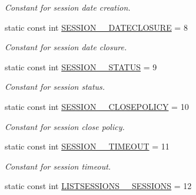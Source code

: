 \begin{DoxyCompactItemize}
\begin{DoxyCompactList}\small\item\em Constant for session date creation. \item\end{DoxyCompactList}\item 
\hypertarget{classUMS__Data_1_1UMS__DataPackage_a870200153f23867dd869f3ebe251b6c2}{
static const int \hyperlink{classUMS__Data_1_1UMS__DataPackage_a870200153f23867dd869f3ebe251b6c2}{SESSION\_\-\_\-DATECLOSURE} = 8}
\label{classUMS__Data_1_1UMS__DataPackage_a870200153f23867dd869f3ebe251b6c2}

\begin{DoxyCompactList}\small\item\em Constant for session date closure. \item\end{DoxyCompactList}\item 
\hypertarget{classUMS__Data_1_1UMS__DataPackage_a7ff54094507a9ae61efb3e4b3c8d2afa}{
static const int \hyperlink{classUMS__Data_1_1UMS__DataPackage_a7ff54094507a9ae61efb3e4b3c8d2afa}{SESSION\_\-\_\-STATUS} = 9}
\label{classUMS__Data_1_1UMS__DataPackage_a7ff54094507a9ae61efb3e4b3c8d2afa}

\begin{DoxyCompactList}\small\item\em Constant for session status. \item\end{DoxyCompactList}\item 
\hypertarget{classUMS__Data_1_1UMS__DataPackage_a32718def2b47a98f55bb93a8b316d7d5}{
static const int \hyperlink{classUMS__Data_1_1UMS__DataPackage_a32718def2b47a98f55bb93a8b316d7d5}{SESSION\_\-\_\-CLOSEPOLICY} = 10}
\label{classUMS__Data_1_1UMS__DataPackage_a32718def2b47a98f55bb93a8b316d7d5}

\begin{DoxyCompactList}\small\item\em Constant for session close policy. \item\end{DoxyCompactList}\item 
\hypertarget{classUMS__Data_1_1UMS__DataPackage_aa31d939cb0a505b1181920b03c383f80}{
static const int \hyperlink{classUMS__Data_1_1UMS__DataPackage_aa31d939cb0a505b1181920b03c383f80}{SESSION\_\-\_\-TIMEOUT} = 11}
\label{classUMS__Data_1_1UMS__DataPackage_aa31d939cb0a505b1181920b03c383f80}

\begin{DoxyCompactList}\small\item\em Constant for session timeout. \item\end{DoxyCompactList}\item 
\hypertarget{classUMS__Data_1_1UMS__DataPackage_a46d8bc393dd6021683af369f848fa217}{
static const int \hyperlink{classUMS__Data_1_1UMS__DataPackage_a46d8bc393dd6021683af369f848fa217}{LISTSESSIONS\_\-\_\-SESSIONS} = 12}
\label{classUMS__Data_1_1UMS__DataPackage_a46d8bc393dd6021683af369f848fa217}


\end{DoxyCompactItemize}
